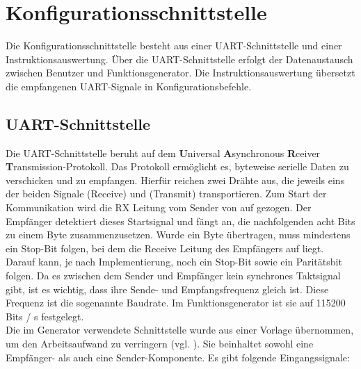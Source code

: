 \section{Konfigurationsschnittstelle} \label{Comp:Conf}
Die Konfigurationsschnittstelle besteht aus einer UART-Schnittstelle und einer Instruktionsauswertung.
Über die UART-Schnittstelle erfolgt der Datenaustausch zwischen Benutzer und Funktionsgenerator.
Die Instruktionsauswertung übersetzt die empfangenen UART-Signale in Konfigurationsbefehle.

\subsection{UART-Schnittstelle}
Die UART-Schnittstelle beruht auf dem \textbf{U}niversal \textbf{A}synchronous \textbf{R}ceiver \textbf{T}ransmission-Protokoll.
Das Protokoll ermöglicht es, byteweise serielle Daten zu verschicken und zu empfangen.
Hierfür reichen zwei Drähte aus, die jeweils eins der beiden Signale  (Receive) und  (Transmit) transportieren.
Zum Start der Kommunikation wird die RX Leitung vom Sender von  auf  gezogen.
Der Empfänger detektiert dieses Startsignal und fängt an, die nachfolgenden acht Bits zu einem Byte zusammenzusetzen.
Wurde ein Byte übertragen, muss mindestens ein Stop-Bit folgen, bei dem die Receive Leitung des Empfängers auf  liegt.
Darauf kann, je nach Implementierung, noch ein Stop-Bit sowie ein Paritätsbit folgen.
Da es zwischen dem Sender und Empfänger kein synchrones Taktsignal gibt, ist es wichtig, dass ihre Sende- und Empfangsfrequenz gleich ist.
Diese Frequenz ist die sogenannte Baudrate.
Im Funktionsgenerator ist sie auf 115200 Bits / s festgelegt. \\
Die im Generator verwendete Schnittstelle wurde aus einer Vorlage übernommen, um den Arbeitsaufwand zu verringern (vgl. \cite{digilent2020}).
Sie beinhaltet sowohl eine Empfänger- als auch eine Sender-Komponente.
Es gibt folgende Eingangssignale:
